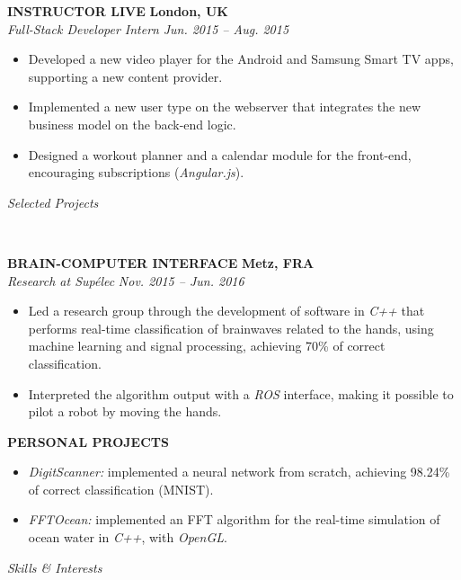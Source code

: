 \documentclass[a4paper, 12pt]{article}
\newcommand{\marginline}{-0.3cm}
\newcommand{\margincontent}{-0.6cm}
\newcommand{\marginbeforesection}{0.35cm}
\newcommand{\marginbeforemisc}{-0.75cm}
\newcommand{\linewidthperso}{0.02cm}
\newcommand{\styletitle}[1]{\textbf{#1}}
\newcommand{\styledesc}[1]{\textit{#1}}
\newcommand{\styleloc}[1]{\textbf{#1}}
\newcommand{\styledates}[1]{\textit{#1}}
\newcommand{\stylesection}[1]{
  \vspace{\marginbeforesection}
  \begin{normalsize}\textit{#1}\end{normalsize}
  \vspace{\marginline}\\
  \noindent\makebox[\linewidth]{\rule{\textwidth}{\linewidthperso}}

}
\begin{document}
\begin{footnotesize}
\styletitle{INSTRUCTOR LIVE} \hfill \styleloc{London, UK}\\
\styledesc{Full-Stack Developer Intern} \hfill \styledates{Jun. 2015 -- Aug. 2015}\\
\vspace{\margincontent}
\begin{itemize}
  \item Developed a new video player for the Android and Samsung Smart TV apps, supporting a new content provider.
  \item Implemented a new user type on the webserver that integrates the new business model on the back-end logic.
  \item Designed a workout planner and a calendar module for the front-end, encouraging subscriptions (\textit{Angular.js}).
\end{itemize}

\stylesection{Selected Projects}
   
\styletitle{BRAIN-COMPUTER INTERFACE} \hfill \styleloc{Metz, FRA}\\
\styledesc{Research at Sup\'elec} \hfill \styledates{Nov. 2015 -- Jun. 2016}\\
\vspace{\margincontent}
\begin{itemize}
  \item Led a research group through the development of software in \textit{C++} that performs real-time classification of brainwaves related to the hands, using machine learning and signal processing, achieving 70\% of correct classification.
  \item Interpreted the algorithm output with a \textit{ROS} interface, making it possible to pilot a robot by moving the hands.
\end{itemize}

\styletitle{PERSONAL PROJECTS}\\
\vspace{\margincontent}
\begin{itemize}
  \item \textit{DigitScanner:} implemented a neural network from scratch, achieving 98.24\% of correct classification (MNIST).
  \item \textit{FFTOcean:} implemented an FFT algorithm for the real-time simulation of ocean water in \textit{C++}, with \textit{OpenGL}.
\end{itemize}

\stylesection{Skills \& Interests}
~\\
\vspace{\marginbeforemisc}


\end{footnotesize}
\end{document}
